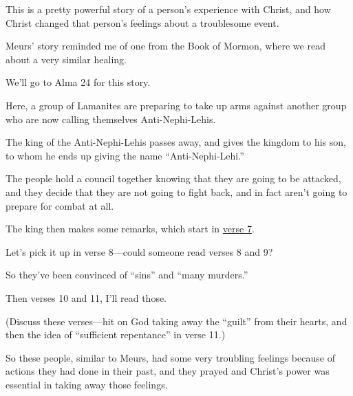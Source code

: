\begin{compactitem}
			\item This is a pretty powerful story of a person's experience with Christ, and how Christ changed that person's feelings about a troublesome event.
				\begin{compactitem}
					\item Meurs' story reminded me of one from the Book of Mormon, where we read about a very similar healing.
					\item We'll go to Alma 24 for this story.
					\item Here, a group of Lamanites are preparing to take up arms against another group who are now calling themselves Anti-Nephi-Lehis.
					\item The king of the Anti-Nephi-Lehis passes away, and gives the kingdom to his son, to whom he ends up giving the name ``Anti-Nephi-Lehi.'' 
					\item The people hold a council together knowing that they are going to be attacked, and they decide that they are not going to fight back, and in fact aren't going to prepare for combat at all.
					\item The king then makes some remarks, which start in \hyperref[ALMA-24-7]{verse 7}.
					\item Let's pick it up in verse 8---could someone read verses 8 and 9?
					\item So they've been convinced of ``sins'' and ``many murders.'' 
					\item Then verses 10 and 11, I'll read those.
					\item (Discuss these verses---hit on God taking away the ``guilt'' from their hearts, and then the idea of ``sufficient repentance'' in verse 11.)
					\item So these people, similar to Meurs, had some very troubling feelings because of actions they had done in their past, and they prayed and Christ's power was essential in taking away those feelings.
				\end{compactitem}
				

\end{compactitem}
